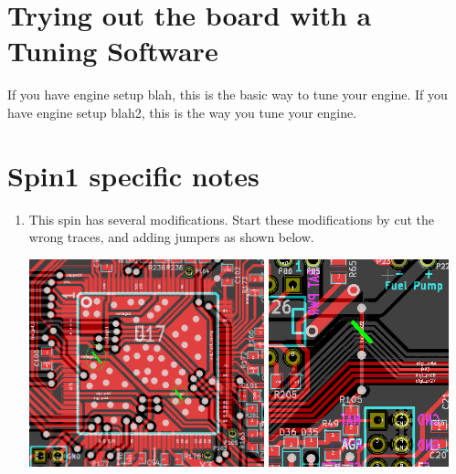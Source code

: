 \documentclass[12pt,a4paper,titlepage]{article}
\begin{document}
\section{Trying out the board with a Tuning Software}

If you have engine setup blah, this is the basic way to tune your engine.
If you have engine setup blah2, this is the way you tune your engine.

\section{Spin1 specific notes}

\begin{enumerate}
\item This spin has several modifications. Start these modifications by cut the wrong traces, and adding jumpers as shown below.

\begin{center}
\includegraphics[height = 6cm]{images/MCU_VDD_traces.png}
\includegraphics[height = 6cm]{images/BRV_hack.png}


\end{center}
\end{enumerate}
\end{document}
